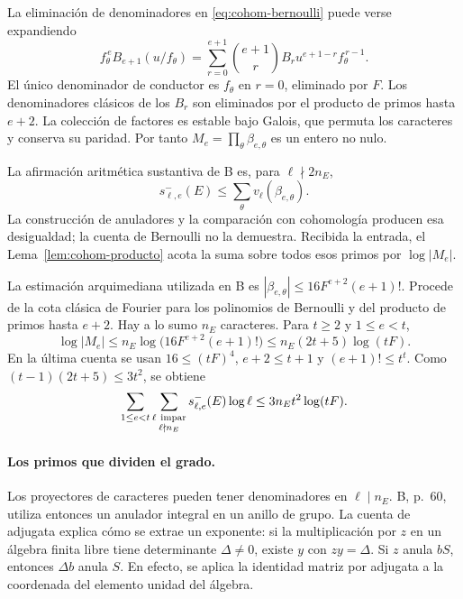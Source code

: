 La eliminación de denominadores en
\eqref{eq:cohom-bernoulli} puede verse expandiendo
\[
 f_\theta^{\,e}B_{e+1}(u/f_\theta)
 =\sum_{r=0}^{e+1}\binom{e+1}{r}
       B_r u^{e+1-r}f_\theta^{\,r-1}.
\]
El único denominador de conductor es $f_\theta$ en
$r=0$, eliminado por $F$.
Los denominadores clásicos de los $B_r$ son eliminados
por el producto de primos hasta $e+2$.
La colección de factores es estable bajo Galois,
que permuta los caracteres y conserva su paridad.
Por tanto $M_e=\prod_\theta\beta_{e,\theta}$ es un
entero no nulo.

La afirmación aritmética sustantiva de B es, para
$\ell\nmid2n_E$,
\begin{equation}
 s_{\ell,e}^{-}(E)
 \le\sum_\theta v_\ell(\beta_{e,\theta}).
 \label{eq:cohom-menos-entrada}
\end{equation}
La construcción de anuladores y la comparación con
cohomología producen esa desigualdad; la cuenta de
Bernoulli no la demuestra.
Recibida la entrada, el
Lema~\ref{lem:cohom-producto} acota la suma sobre todos
esos primos por $\log|M_e|$.

La estimación arquimediana utilizada en B es
$|\beta_{e,\theta}|\le16F^{e+2}(e+1)!$.
Procede de la cota clásica de Fourier para los polinomios
de Bernoulli y del producto de primos hasta $e+2$.
Hay a lo sumo $n_E$ caracteres. Para $t\ge2$ y
$1\le e<t$,
\[
 \log|M_e|
 \le n_E\log\!\bigl(16F^{e+2}(e+1)!\bigr)
 \le n_E(2t+5)\log(tF).
\]
En la última cuenta se usan
$16\le(tF)^4$, $e+2\le t+1$ y $(e+1)!\le t^t$.
Como $(t-1)(2t+5)\le3t^2$, se obtiene
\begin{equation}
 \sum_{1\le e<t}
 \sum_{\substack{\ell\ {\rm impar}\\\ell\nmid n_E}}
   s_{\ell,e}^{-}(E)\log\ell
 \le3n_Et^2\log(tF).
 \label{eq:cohom-menos-buenos}
\end{equation}

\paragraph{Los primos que dividen el grado.}
Los proyectores de caracteres pueden tener denominadores
en $\ell\mid n_E$.
B, p.~60, utiliza entonces un anulador integral en un
anillo de grupo. La cuenta de adjugata explica cómo
se extrae un exponente: si la multiplicación por $z$
en un álgebra finita libre tiene determinante
$\Delta\ne0$, existe $y$ con $zy=\Delta$.
Si $z$ anula $bS$, entonces $\Delta b$ anula $S$.
En efecto, se aplica la identidad matriz por adjugata
a la coordenada del elemento unidad del álgebra.

